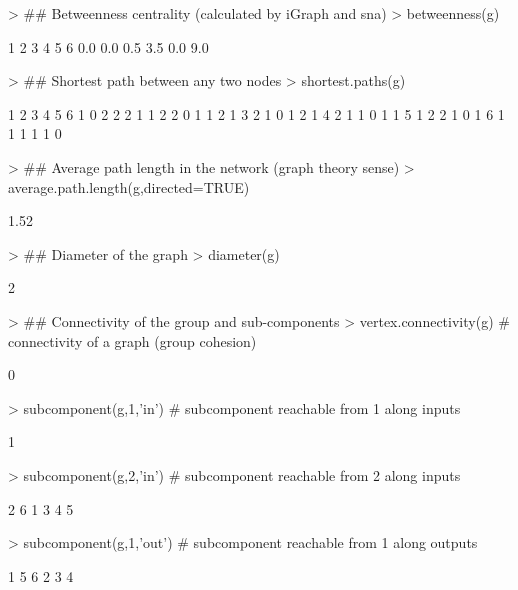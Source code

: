 \documentclass[article]{jss}
\begin{document}
\begin{Schunk}
\begin{Sinput}
> ## Betweenness centrality (calculated by iGraph and sna)
> betweenness(g)
\end{Sinput}
\begin{Soutput}
  1   2   3   4   5   6 
0.0 0.0 0.5 3.5 0.0 9.0 
\end{Soutput}
\begin{Sinput}
> ## Shortest path between any two nodes
> shortest.paths(g)
\end{Sinput}
\begin{Soutput}
  1 2 3 4 5 6
1 0 2 2 2 1 1
2 2 0 1 1 2 1
3 2 1 0 1 2 1
4 2 1 1 0 1 1
5 1 2 2 1 0 1
6 1 1 1 1 1 0
\end{Soutput}
\begin{Sinput}
> ## Average path length in the network (graph theory sense)
> average.path.length(g,directed=TRUE)
\end{Sinput}
\begin{Soutput}
[1] 1.52
\end{Soutput}
\begin{Sinput}
> ## Diameter of the graph
> diameter(g)
\end{Sinput}
\begin{Soutput}
[1] 2
\end{Soutput}
\begin{Sinput}
> ## Connectivity of the group and sub-components
> vertex.connectivity(g)  # connectivity of a graph (group cohesion)
\end{Sinput}
\begin{Soutput}
[1] 0
\end{Soutput}
\begin{Sinput}
> subcomponent(g,1,'in')  # subcomponent reachable from 1 along inputs
\end{Sinput}
\begin{Soutput}
[1] 1
\end{Soutput}
\begin{Sinput}
> subcomponent(g,2,'in')  # subcomponent reachable from 2 along inputs
\end{Sinput}
\begin{Soutput}
[1] 2 6 1 3 4 5
\end{Soutput}
\begin{Sinput}
> subcomponent(g,1,'out') # subcomponent reachable from 1 along outputs
\end{Sinput}
\begin{Soutput}
[1] 1 5 6 2 3 4
\end{Soutput}

\end{Schunk}
\end{document}

